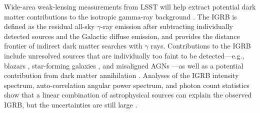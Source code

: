
Wide-area weak-lensing measurements from LSST will help extract  potential dark matter contributions to the isotropic gamma-ray background \citep[IGRB;][]{1410.3696}. The IGRB is defined as the residual all-sky $\gamma$-ray emission after subtracting individually detected sources and the Galactic diffuse emission, and provides the distance frontier of indirect dark matter searches with $\gamma$ rays. Contributions to the IGRB include unresolved sources that are individually too faint to be detected---e.g., blazars \citep{1110.3787,1310.0006}, star-forming galaxies \citep{1206.1346}, and misaligned AGNs \citep{1304.0908}---as well as a potential contribution from dark matter annihilation \citep{1312.0608,1501.05464,1501.05301,1608.07289}. Analyses of the IGRB intensity spectrum, auto-correlation angular power spectrum, and photon count statistics show that a linear combination of astrophysical sources can explain the observed IGRB, but the uncertainties are still large \citep[e.g.,][]{1502.02866}.

